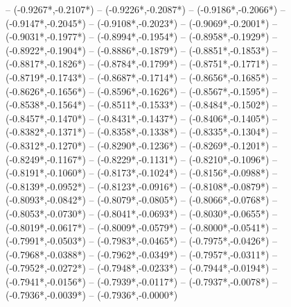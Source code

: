 {	-- ({-0.9267*\dx},{-0.2107*\dy})
	-- ({-0.9226*\dx},{-0.2087*\dy})
	-- ({-0.9186*\dx},{-0.2066*\dy})
	-- ({-0.9147*\dx},{-0.2045*\dy})
	-- ({-0.9108*\dx},{-0.2023*\dy})
	-- ({-0.9069*\dx},{-0.2001*\dy})
	-- ({-0.9031*\dx},{-0.1977*\dy})
	-- ({-0.8994*\dx},{-0.1954*\dy})
	-- ({-0.8958*\dx},{-0.1929*\dy})
	-- ({-0.8922*\dx},{-0.1904*\dy})
	-- ({-0.8886*\dx},{-0.1879*\dy})
	-- ({-0.8851*\dx},{-0.1853*\dy})
	-- ({-0.8817*\dx},{-0.1826*\dy})
	-- ({-0.8784*\dx},{-0.1799*\dy})
	-- ({-0.8751*\dx},{-0.1771*\dy})
	-- ({-0.8719*\dx},{-0.1743*\dy})
	-- ({-0.8687*\dx},{-0.1714*\dy})
	-- ({-0.8656*\dx},{-0.1685*\dy})
	-- ({-0.8626*\dx},{-0.1656*\dy})
	-- ({-0.8596*\dx},{-0.1626*\dy})
	-- ({-0.8567*\dx},{-0.1595*\dy})
	-- ({-0.8538*\dx},{-0.1564*\dy})
	-- ({-0.8511*\dx},{-0.1533*\dy})
	-- ({-0.8484*\dx},{-0.1502*\dy})
	-- ({-0.8457*\dx},{-0.1470*\dy})
	-- ({-0.8431*\dx},{-0.1437*\dy})
	-- ({-0.8406*\dx},{-0.1405*\dy})
	-- ({-0.8382*\dx},{-0.1371*\dy})
	-- ({-0.8358*\dx},{-0.1338*\dy})
	-- ({-0.8335*\dx},{-0.1304*\dy})
	-- ({-0.8312*\dx},{-0.1270*\dy})
	-- ({-0.8290*\dx},{-0.1236*\dy})
	-- ({-0.8269*\dx},{-0.1201*\dy})
	-- ({-0.8249*\dx},{-0.1167*\dy})
	-- ({-0.8229*\dx},{-0.1131*\dy})
	-- ({-0.8210*\dx},{-0.1096*\dy})
	-- ({-0.8191*\dx},{-0.1060*\dy})
	-- ({-0.8173*\dx},{-0.1024*\dy})
	-- ({-0.8156*\dx},{-0.0988*\dy})
	-- ({-0.8139*\dx},{-0.0952*\dy})
	-- ({-0.8123*\dx},{-0.0916*\dy})
	-- ({-0.8108*\dx},{-0.0879*\dy})
	-- ({-0.8093*\dx},{-0.0842*\dy})
	-- ({-0.8079*\dx},{-0.0805*\dy})
	-- ({-0.8066*\dx},{-0.0768*\dy})
	-- ({-0.8053*\dx},{-0.0730*\dy})
	-- ({-0.8041*\dx},{-0.0693*\dy})
	-- ({-0.8030*\dx},{-0.0655*\dy})
	-- ({-0.8019*\dx},{-0.0617*\dy})
	-- ({-0.8009*\dx},{-0.0579*\dy})
	-- ({-0.8000*\dx},{-0.0541*\dy})
	-- ({-0.7991*\dx},{-0.0503*\dy})
	-- ({-0.7983*\dx},{-0.0465*\dy})
	-- ({-0.7975*\dx},{-0.0426*\dy})
	-- ({-0.7968*\dx},{-0.0388*\dy})
	-- ({-0.7962*\dx},{-0.0349*\dy})
	-- ({-0.7957*\dx},{-0.0311*\dy})
	-- ({-0.7952*\dx},{-0.0272*\dy})
	-- ({-0.7948*\dx},{-0.0233*\dy})
	-- ({-0.7944*\dx},{-0.0194*\dy})
	-- ({-0.7941*\dx},{-0.0156*\dy})
	-- ({-0.7939*\dx},{-0.0117*\dy})
	-- ({-0.7937*\dx},{-0.0078*\dy})
	-- ({-0.7936*\dx},{-0.0039*\dy})
	-- ({-0.7936*\dx},{-0.0000*\dy})
}

